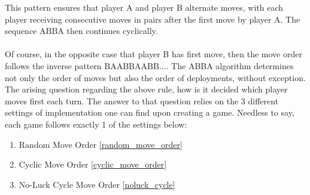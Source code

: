 This pattern ensures that player A and player B alternate moves, with each player receiving consecutive moves in pairs after the first move by player A. The sequence $\text{ABBA}$ then continues cyclically.
\\
\\
Of course, in the opposite case that player B has first move, then the move order follows the inverse pattern $\text{BAABBAABB} \dots$. The ABBA algorithm determines not only the order of moves but also the order of deployments, without exception. The arising question regarding the above rule, how is it decided which player moves first each turn. The answer to that question relies on the 3 different settings of implementation one can find upon creating a game. Needless to say, each game follows exactly 1 of the settings below:
\begin{enumerate}
    \item Random Move Order \ref{random_move_order}
    \item Cyclic Move Order \ref{cyclic_move_order}
    \item No-Luck Cycle Move Order \ref{noluck_cycle}
\end{enumerate}



